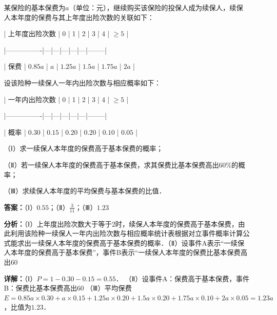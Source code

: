 \begin{question}[points=12]
某保险的基本保费为$a$（单位：元），继续购买该保险的投保人成为续保人，续保人本年度的保费与其上年度出险次数的关联如下：



| 上年度出险次数 | 0 | 1 | 2 | 3 | 4 | $\ge5$ |

|----------------|---|---|---|---|---|--------|

| 保费 | $0.85a$ | $a$ | $1.25a$ | $1.5a$ | $1.75a$ | $2a$ |



设该险种一续保人一年内出险次数与相应概率如下：



| 一年内出险次数 | 0 | 1 | 2 | 3 | 4 | $\ge5$ |

|----------------|---|---|---|---|---|--------|

| 概率 | $0.30$ | $0.15$ | $0.20$ | $0.20$ | $0.10$ | $0.05$ |



（Ⅰ）求一续保人本年度的保费高于基本保费的概率；

（Ⅱ）若一续保人本年度的保费高于基本保费，求其保费比基本保费高出$60\%$的概率；

（Ⅲ）求续保人本年度的平均保费与基本保费的比值．
\begin{solution}
\textbf{答案：}（Ⅰ）$0.55$；（Ⅱ）$\frac{3}{11}$；（Ⅲ）$1.23$

\textbf{分析：}（Ⅰ）上年度出险次数大于等于2时，续保人本年度的保费高于基本保费，由此利用该险种一续保人一年内出险次数与相应概率统计表根据对立事件概率计算公式能求出一续保人本年度的保费高于基本保费的概率．（Ⅱ）设事件A表示“一续保人本年度的保费高于基本保费”，事件B表示“一续保人本年度的保费比基本保费高出60%

\textbf{详解：}（Ⅰ）$P=1-0.30-0.15=0.55$．
（Ⅱ）设事件A：保费高于基本保费，事件B：保费比基本保费高出60%
（Ⅲ）平均保费$E=0.85a\times0.30+a\times0.15+1.25a\times0.20+1.5a\times0.20+1.75a\times0.10+2a\times0.05=1.23a$，比值为$1.23$．
\end{solution}
\end{question}

